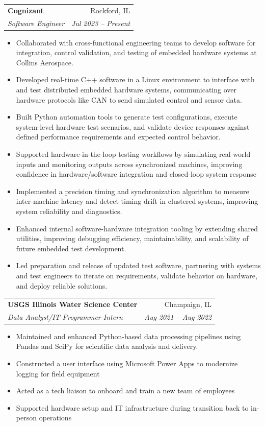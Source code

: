 \documentclass[letterpaper,11pt]{article}
\makeatletter
\newcommand{\resumeItem}[1]{
  \item\small{
    {#1 \vspace{-3pt}}
  }
}
\newcommand{\resumeSubheading}[4]{
  \vspace{-1pt}\item
    \begin{tabular*}{0.97\textwidth}[t]{l@{\extracolsep{\fill}}r}
      \textbf{#1} & #2 \\
      \textit{\small#3} & \textit{\small #4} \\
    \end{tabular*}\vspace{-5pt}
}
\newcommand{\resumeSubSubheading}[2]{
    \begin{tabular*}{0.97\textwidth}{l@{\extracolsep{\fill}}r}
      \textit{\small#1} & \textit{\small #2} \\
    \end{tabular*}\vspace{-5pt}
}
\newcommand{\resumeItemListStart}{\begin{itemize}}
\newcommand{\resumeItemListEnd}{\end{itemize}\vspace{-5pt}}
\makeatother
\begin{document}
    \resumeSubheading
      {Cognizant}{Rockford, IL}
      {Software Engineer}{Jul 2023 -- Present}
      \resumeItemListStart
        \resumeItem{Collaborated with cross-functional engineering teams to develop software for integration, control validation, and testing of embedded hardware systems at Collins Aerospace.}
        \resumeItem{Developed real-time C++ software in a Linux environment to interface with and test distributed embedded hardware systems, communicating over hardware protocols like CAN to send simulated control and sensor data.}
        \resumeItem{Built Python automation tools to generate test configurations, execute system-level hardware test scenarios, and validate device responses against defined performance requirements and expected control behavior.}
        \resumeItem{Supported hardware-in-the-loop testing workflows by simulating real-world inputs and monitoring outputs across synchronized machines, improving confidence in hardware/software integration and closed-loop system response}
        \resumeItem{Implemented a precision timing and synchronization algorithm to measure inter-machine latency and detect timing drift in clustered systems, improving system reliability and diagnostics.}
        \resumeItem{Enhanced internal software-hardware integration tooling by extending shared utilities, improving debugging efficiency, maintainability, and scalability of future embedded test development.}
        \resumeItem{Led preparation and release of updated test software, partnering with systems and test engineers to iterate on requirements, validate behavior on hardware, and deploy reliable solutions.}
      \resumeItemListEnd
      


    \resumeSubheading
      {USGS Illinois Water Science Center}{Champaign, IL}
      {Data Analyst/IT Programmer Intern}{Aug 2021 -- Aug 2022}
      \resumeItemListStart
        \resumeItem{Maintained and enhanced Python-based data processing pipelines using Pandas and SciPy for scientific data analysis and delivery.}
        \resumeItem{Constructed a user interface using Microsoft Power Apps to modernize logging for field equipment}
        \resumeItem{Acted as a tech liaison to onboard and train a new team of employees}
        \resumeItem{Supported hardware setup and IT infrastructure during transition back to in-person operations}
      \resumeItemListEnd
\end{document}
